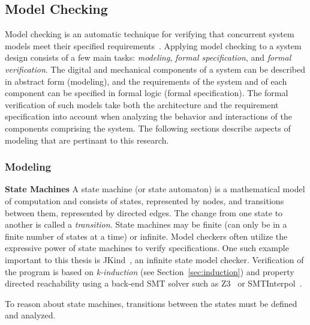 \subsection{Model Checking}
\label{sec:modelchecking}
Model checking is an automatic technique for verifying that concurrent system models meet their specified requirements~\cite{clarke2018model}.  Applying model checking to a system design consists of a few main tasks: \emph{modeling}, \emph{formal specification}, and \emph{formal verification}. The digital and mechanical components of a system can be described in abstract form (modeling), and the requirements of the system and of each component can be specified in formal logic (formal specification). The formal verification of such models take both the architecture and the requirement specification into account when analyzing the behavior and interactions of the components comprising the system. The following sections describe aspects of modeling that are pertinant to this research.

\subsubsection{Modeling}
\label{sec:modeling}

\textbf{State Machines}
A state machine (or state automaton) is a mathematical model of computation and consists of states, represented by nodes, and transitions between them, represented by directed edges. The change from one state to another is called a {\em transition}. State machines may be finite (can only be in a finite number of states at a time) or infinite. %
Model checkers often utilize the expressive power of state machines to verify specifications. One such example important to this thesis is JKind~\cite{2017arXiv171201222G}, an infinite state model checker. Verification of the program is based on {\em k-induction} (see Section~\ref{sec:induction}) and property directed reachability using a back-end SMT solver such as Z3~\cite{z3} or SMTInterpol~\cite{smtInterpol}. 

To reason about state machines, transitions between the states must be defined and analyzed.

